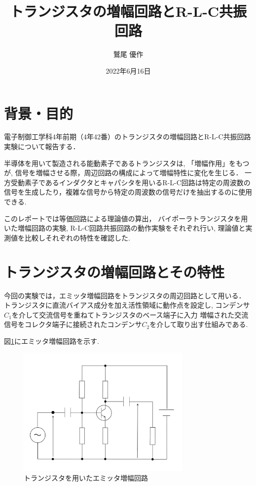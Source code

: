 \documentclass[dvipdfmx,titlepage,a4j]{jsarticle}  %
\title{トランジスタの増幅回路とR-L-C共振回路}
\author{鷲尾 優作}
\date{2022年6月16日}
\numberwithin{equation}{section}
\begin{document}
\pagestyle{foot}

\maketitle

\section{背景・目的}
電子制御工学科4年前期（4年42番）のトランジスタの増幅回路とR-L-C共振回路実験について報告する．

半導体を用いて製造される能動素子であるトランジスタは, 「増幅作用」をもつが, 信号を増幅させる際，周辺回路の構成によって増幅特性に変化を生じる．
一方受動素子であるインダクタとキャパシタを用いるR-L-C回路は特定の周波数の信号を生成したり，複雑な信号から特定の周波数の信号だけを抽出するのに使用できる.

このレポートでは等価回路による理論値の算出，
バイポーラトランジスタを用いた増幅回路の実験, R-L-C回路共振回路の動作実験をそれぞれ行い,
理論値と実測値を比較しそれぞれの特性を確認した.

\section{トランジスタの増幅回路とその特性}
今回の実験では，エミッタ増幅回路をトランジスタの周辺回路として用いる．
トランジスタに直流バイアス成分を加え活性領域に動作点を設定し,
コンデンサ$C_1$を介して交流信号を重ねてトランジスタのベース端子に入力
増幅された交流信号をコレクタ端子に接続されたコンデンサ$C_2$を介して取り出す仕組みである.

図\ref{fig:fig1.jpg}にエミッタ増幅回路を示す.
\begin{figure}[H]
  \centering
  \includegraphics[width=8.5cm]{../fig/fig1.jpg}
  \caption{トランジスタを用いたエミッタ増幅回路}
  \label{fig:fig1.jpg}
\end{figure}
\end{document}
